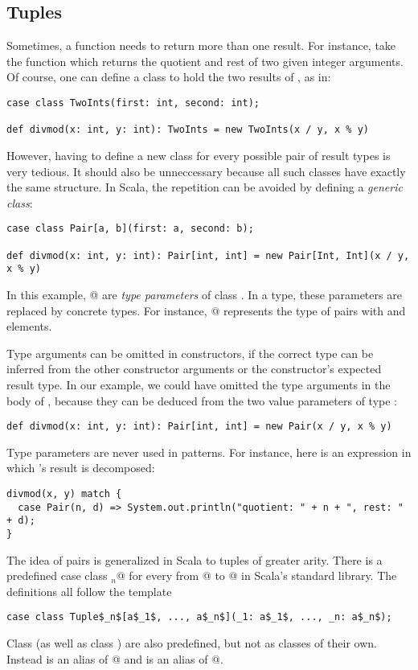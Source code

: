 \documentclass[11pt]{book}
\begin{document}
\subsection*{Tuples}

Sometimes, a function needs to return more than one result. For
instance, take the function \verb@divmod@ which returns the quotient
and rest of two given integer arguments.  Of course, one can
define a class to hold the two results of \verb@divmod@, as in:
\begin{verbatim}
case class TwoInts(first: int, second: int);

def divmod(x: int, y: int): TwoInts = new TwoInts(x / y, x % y)
\end{verbatim}
However, having to define a new class for every possible pair of
result types is very tedious. It should also be unneccessary because
all such classes have exactly the same structure. In Scala, the
repetition can be avoided by defining a {\em generic class}:
\begin{verbatim}
case class Pair[a, b](first: a, second: b);

def divmod(x: int, y: int): Pair[int, int] = new Pair[Int, Int](x / y, x % y)
\end{verbatim}
In this example, \verb@[a, b]@ are {\em type parameters} of class
\verb@Pair@. In a \verb@Pair@ type, these parameters are replaced by
concrete types. For instance, @ represents the
type of pairs with \verb@int@ and \verb@String@ elements.

Type arguments can be omitted in constructors, if the correct type can
be inferred from the other constructor arguments or the constructor's
expected result type. In our example, we could have omitted the type
arguments in the body of \verb@divmod@, because they can be deduced
from the two value parameters of type \verb@int@:
\begin{verbatim}
def divmod(x: int, y: int): Pair[int, int] = new Pair(x / y, x % y)
\end{verbatim}
Type parameters are never used in patterns. For instance, here is an
expression in which \verb@divmod@'s result is decomposed:
\begin{verbatim}
divmod(x, y) match {
  case Pair(n, d) => System.out.println("quotient: " + n + ", rest: " + d);
}
\end{verbatim}
The idea of pairs is generalized in Scala to tuples of greater arity.
There is a predefined case class \verb@Tuple$_n$@ for every \verb@n@
from @ to @ in Scala's standard library. The
definitions all follow the template
\begin{verbatim}
case class Tuple$_n$[a$_1$, ..., a$_n$](_1: a$_1$, ..., _n: a$_n$);
\end{verbatim}
Class \verb@Pair@ (as well as class \verb@Triple@) are also
predefined, but not as classes of their own. Instead 
\verb@Pair@ is an alias of @ and \verb@Triple@ is an
alias of @. 
\end{document}

